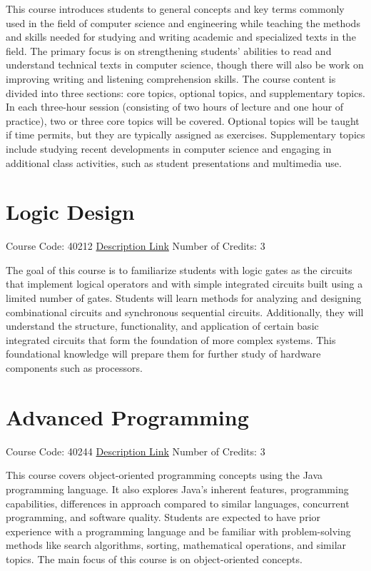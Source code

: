 \documentclass[
fontsize=11pt,
paper=a4,
parskip=half,
enlargefirstpage=off,    %
fromalign=right,        %
fromphone=on,           %
fromemail=on,
fromrule=off,           %
addrfield=off,          %
backaddress=on,         %
subject=beforeopening,  %
locfield=narrow,        %
foldmarks=off,          %
open=any
]{scrartcl}
\begin{document}
This course introduces students to general concepts and key terms commonly used in the field of computer science and engineering while teaching the methods and skills needed for studying and writing academic and specialized texts in the field. The primary focus is on strengthening students' abilities to read and understand technical texts in computer science, though there will also be work on improving writing and listening comprehension skills. The course content is divided into three sections: core topics, optional topics, and supplementary topics. In each three-hour session (consisting of two hours of lecture and one hour of practice), two or three core topics will be covered. Optional topics will be taught if time permits, but they are typically assigned as exercises. Supplementary topics include studying recent developments in computer science and engaging in additional class activities, such as student presentations and multimedia use.

\section{Logic Design}
Course Code: 40212 \qquad \quad \href{https://docs.ce.sharif.edu/course/40212}{Description Link}
\qquad \quad Number of Credits: 3

The goal of this course is to familiarize students with logic gates as the circuits that implement logical operators and with simple integrated circuits built using a limited number of gates. Students will learn methods for analyzing and designing combinational circuits and synchronous sequential circuits. Additionally, they will understand the structure, functionality, and application of certain basic integrated circuits that form the foundation of more complex systems. This foundational knowledge will prepare them for further study of hardware components such as processors.


\section{Advanced Programming}
Course Code: 40244 \qquad \quad \href{https://docs.ce.sharif.edu/course/40244}{Description Link}
\qquad \quad Number of Credits: 3

This course covers object-oriented programming concepts using the Java programming language. It also explores Java's inherent features, programming capabilities, differences in approach compared to similar languages, concurrent programming, and software quality. Students are expected to have prior experience with a programming language and be familiar with problem-solving methods like search algorithms, sorting, mathematical operations, and similar topics. The main focus of this course is on object-oriented concepts.
\end{document}
